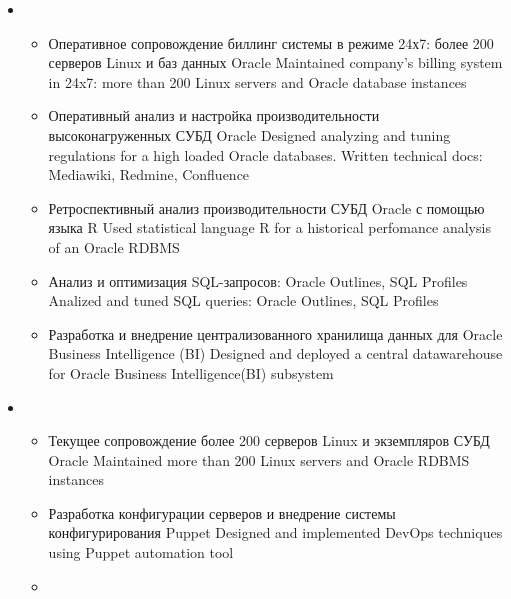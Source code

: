 \documentclass[11pt,a4paper,sans, russian]{moderncv}        %
\begin{document}
{\begin{itemize}
\begin{itemize}
			\item {}
				{Разработка регламентов обеспечения отказоустойчивости систем биллинга: Oracle STANDBY database, Oracle DataGuard, Oracle GoldenGate}
				{Designed a fault tolerance strategy for company's billing system: Oracle standby, Oracle DataGuard, Oracle GoldenGate}
		\end{itemize}
	\item {}
		\begin{itemize}
			\item {}
				{Оперативное сопровождение биллинг системы в режиме 24х7: более 200 серверов Linux и баз данных Oracle}
				{Maintained company's billing system in 24x7: more than 200 Linux servers and Oracle database instances}
			\item {}
				{Оперативный анализ и настройка производительности высоконагруженных СУБД Oracle}
				{Designed analyzing and tuning regulations for a high loaded Oracle databases. Written technical docs: Mediawiki, Redmine, Confluence}
			\item {}
				{Ретроспективный анализ производительности СУБД Oracle с помощью языка R}
				{Used statistical language R for a historical perfomance analysis of an Oracle RDBMS}
			\item {}
				{Анализ и оптимизация SQL-запросов: Oracle Outlines, SQL Profiles}
				{Analized and tuned SQL queries: Oracle Outlines, SQL Profiles}
			\item {}
				{Разработка и внедрение централизованного хранилища данных для Oracle Business Intelligence (BI)}
				{Designed and deployed a central datawarehouse for Oracle Business Intelligence(BI) subsystem}
		\end{itemize}
	\item {}
		\begin{itemize}
			\item {}
				{Текущее сопровождение более 200 серверов Linux и экземпляров СУБД Oracle}
				{Maintained more than 200 Linux servers and Oracle RDBMS instances}
			\item {}
				{Разработка конфигурации серверов и внедрение системы конфигурирования Puppet}
				{Designed and implemented DevOps techniques using Puppet automation tool}
			\item {}

\end{itemize}
\end{itemize}}
\end{document}
